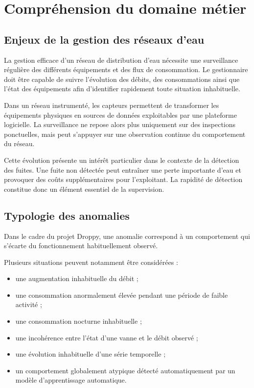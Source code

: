 \section{Compréhension du domaine métier}

\subsection{Enjeux de la gestion des réseaux d'eau}

La gestion efficace d'un réseau de distribution d'eau nécessite une
surveillance régulière des différents équipements et des flux de
consommation. Le gestionnaire doit être capable de suivre l'évolution des
débits, des consommations ainsi que l'état des équipements afin
d'identifier rapidement toute situation inhabituelle.

Dans un réseau instrumenté, les capteurs permettent de transformer les
équipements physiques en sources de données exploitables par une plateforme
logicielle. La surveillance ne repose alors plus uniquement sur des
inspections ponctuelles, mais peut s'appuyer sur une observation continue
du comportement du réseau.

Cette évolution présente un intérêt particulier dans le contexte de la
détection des fuites. Une fuite non détectée peut entraîner une perte
importante d'eau et provoquer des coûts supplémentaires pour l'exploitant.
La rapidité de détection constitue donc un élément essentiel de la
supervision.

\subsection{Typologie des anomalies}

Dans le cadre du projet Droppy, une anomalie correspond à un comportement
qui s'écarte du fonctionnement habituellement observé.

Plusieurs situations peuvent notamment être considérées :

\begin{itemize}

    \item une augmentation inhabituelle du débit ;

    \item une consommation anormalement élevée pendant une période de faible
    activité ;

    \item une consommation nocturne inhabituelle ;

    \item une incohérence entre l'état d'une vanne et le débit observé ;

    \item une évolution inhabituelle d'une série temporelle ;

    \item un comportement globalement atypique détecté automatiquement par
    un modèle d'apprentissage automatique.

\end{itemize}

